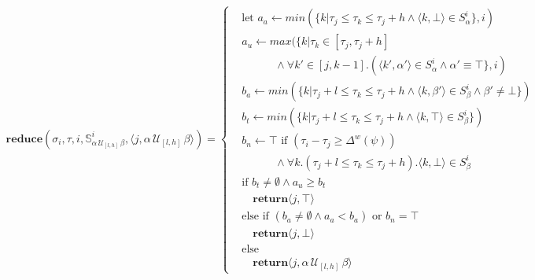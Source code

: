 \documentclass[]{llncs}
\newcommand{\rp}[2]{\ensuremath{\langle #1, #2 \rangle}}
\begin{document}
\begin{align*}
\mathbf{reduce}(\sigma_i,\tau, i,\mathbb{S}^i_{\alpha\, \mathcal{U}_{[l,h]}\, \beta} ,\rp{j}{\alpha\, \mathcal{U}_{[l,h]}\, \beta}) = \left\{
\begin{aligned}
&\text{let } a_a \leftarrow min(\{k | \tau_j \leq \tau_k \leq \tau_j+h  \wedge \rp{k}{\bot} \in S^i_\alpha \},i) \\ 
& a_u \leftarrow max(\{k| \tau_k \in [\tau_j,\tau_j+h] \\
& \quad \quad \quad \wedge \forall k' \in [j,k-1].(\rp{k'}{\alpha'} \in S^i_\alpha \wedge \alpha' \equiv \top\},i) \\
& b_a \leftarrow min(\{k | \tau_j+l \leq \tau_k \leq \tau_j+h \wedge \rp{k}{\beta'} \in S^i_\beta \wedge \beta' \neq \bot\}) \\ 
&b_t \leftarrow min(\{k | \tau_j+l \leq \tau_k \leq \tau_j+h \wedge \rp{k}{\top} \in S^i_{\beta} \}) \\
&b_n \leftarrow \top \text{ if } (\tau_i - \tau_j \geq \Delta^w(\psi)) \\
& \quad \quad \quad \wedge \forall k.(\tau_j+l \leq \tau_k \leq \tau_j+h). \rp{k}{\bot} \in S^i_{\beta} \\
&\text{if } b_t \neq \emptyset \wedge a_u \geq b_t \\
& \quad\mathbf{return} \rp{j}{\top} \\
&\text{else if } (b_a \neq \emptyset \wedge a_a < b_a) \text{ or } b_n = \top\\ & \quad\mathbf{return} \rp{j}{\bot} \\
&\text{else} \\
& \quad\mathbf{return} \rp{j}{\alpha\, \mathcal{U}_{[l,h]}\, \beta}
\end{aligned} \right. \\
\end{align*}
\end{document}
